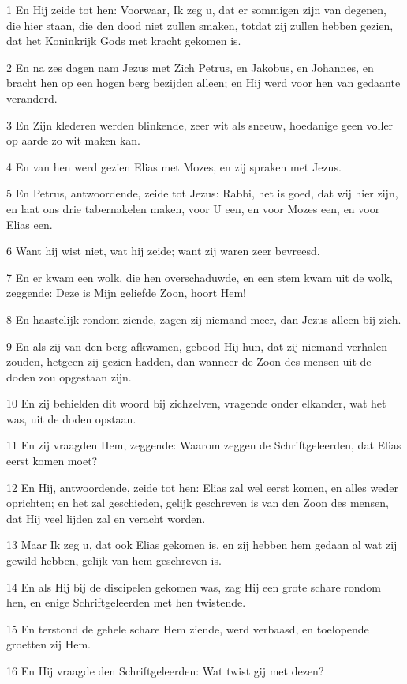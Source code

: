 \par 1 En Hij zeide tot hen: Voorwaar, Ik zeg u, dat er sommigen zijn van degenen, die hier staan, die den dood niet zullen smaken, totdat zij zullen hebben gezien, dat het Koninkrijk Gods met kracht gekomen is.
\par 2 En na zes dagen nam Jezus met Zich Petrus, en Jakobus, en Johannes, en bracht hen op een hogen berg bezijden alleen; en Hij werd voor hen van gedaante veranderd.
\par 3 En Zijn klederen werden blinkende, zeer wit als sneeuw, hoedanige geen voller op aarde zo wit maken kan.
\par 4 En van hen werd gezien Elias met Mozes, en zij spraken met Jezus.
\par 5 En Petrus, antwoordende, zeide tot Jezus: Rabbi, het is goed, dat wij hier zijn, en laat ons drie tabernakelen maken, voor U een, en voor Mozes een, en voor Elias een.
\par 6 Want hij wist niet, wat hij zeide; want zij waren zeer bevreesd.
\par 7 En er kwam een wolk, die hen overschaduwde, en een stem kwam uit de wolk, zeggende: Deze is Mijn geliefde Zoon, hoort Hem!
\par 8 En haastelijk rondom ziende, zagen zij niemand meer, dan Jezus alleen bij zich.
\par 9 En als zij van den berg afkwamen, gebood Hij hun, dat zij niemand verhalen zouden, hetgeen zij gezien hadden, dan wanneer de Zoon des mensen uit de doden zou opgestaan zijn.
\par 10 En zij behielden dit woord bij zichzelven, vragende onder elkander, wat het was, uit de doden opstaan.
\par 11 En zij vraagden Hem, zeggende: Waarom zeggen de Schriftgeleerden, dat Elias eerst komen moet?
\par 12 En Hij, antwoordende, zeide tot hen: Elias zal wel eerst komen, en alles weder oprichten; en het zal geschieden, gelijk geschreven is van den Zoon des mensen, dat Hij veel lijden zal en veracht worden.
\par 13 Maar Ik zeg u, dat ook Elias gekomen is, en zij hebben hem gedaan al wat zij gewild hebben, gelijk van hem geschreven is.
\par 14 En als Hij bij de discipelen gekomen was, zag Hij een grote schare rondom hen, en enige Schriftgeleerden met hen twistende.
\par 15 En terstond de gehele schare Hem ziende, werd verbaasd, en toelopende groetten zij Hem.
\par 16 En Hij vraagde den Schriftgeleerden: Wat twist gij met dezen?

